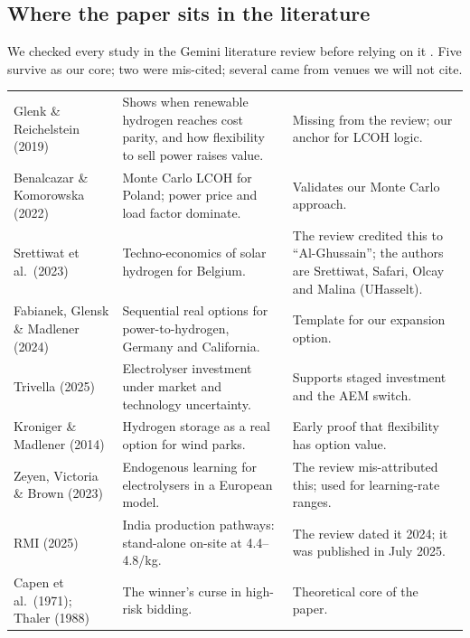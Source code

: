 \subsection{Where the paper sits in the literature}
We checked every study in the Gemini literature review before relying on it \cite{gemlit2026}. Five survive as our core; two were mis-cited; several came from venues we will not cite.

\begin{center}\tablefont
\begin{xltabular}{\textwidth}{@{}P{34mm} L L@{}}
\toprule
{} &  & \\ \midrule
\endhead
Glenk \& Reichelstein (2019) \cite{glenk2019} & Shows when renewable hydrogen reaches cost parity, and how flexibility to sell power raises value. & Missing from the review; our anchor for LCOH logic.\\
Benalcazar \& Komorowska (2022) \cite{benalcazar2022} & Monte Carlo LCOH for Poland; power price and load factor dominate. & Validates our Monte Carlo approach.\\
Srettiwat et al.\ (2023) \cite{srettiwat2023} & Techno-economics of solar hydrogen for Belgium. & The review credited this to ``Al-Ghussain''; the authors are Srettiwat, Safari, Olcay and Malina (UHasselt).\\
Fabianek, Glensk \& Madlener (2024) \cite{fabianek2024} & Sequential real options for power-to-hydrogen, Germany and California. & Template for our expansion option.\\
Trivella (2025) \cite{trivella2025} & Electrolyser investment under market and technology uncertainty. & Supports staged investment and the AEM switch.\\
Kroniger \& Madlener (2014) \cite{kroniger2014} & Hydrogen storage as a real option for wind parks. & Early proof that flexibility has option value.\\
Zeyen, Victoria \& Brown (2023) \cite{zeyen2023} & Endogenous learning for electrolysers in a European model. & The review mis-attributed this; used for learning-rate ranges.\\
RMI (2025) \cite{rmi2025} & India production pathways: stand-alone on-site at \usd{}4.4--4.8/kg. & The review dated it 2024; it was published in July 2025.\\
Capen et al.\ (1971); Thaler (1988) \cite{capen1971,thaler1988} & The winner's curse in high-risk bidding. & Theoretical core of the paper.\\
\bottomrule
\end{xltabular}
\end{center}

